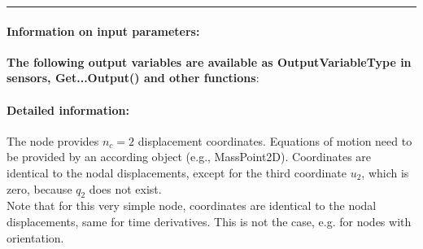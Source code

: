 \par\noindent\rule{\textwidth}{0.4pt}
\label{description_NodePoint2D}
\paragraph{Information on input parameters:} 
\finishTable
{\bf The following output variables are available as OutputVariableType in sensors, Get...Output() and other functions}: 
\finishTable
 \noindent
    \paragraph{Detailed information:}
    The node provides $n_c=2$ displacement coordinates. Equations of motion need to be provided by an according object (e.g., MassPoint2D).
    Coordinates are identical to the nodal displacements, except for the third coordinate $u_2$, which is zero, because $q_2$ does not exist. \vspace{6pt}\\
    Note that for this very simple node, coordinates are identical to the nodal displacements, same for time derivatives. This is not the case, e.g. for nodes with orientation. \vspace{6pt}\\
    
